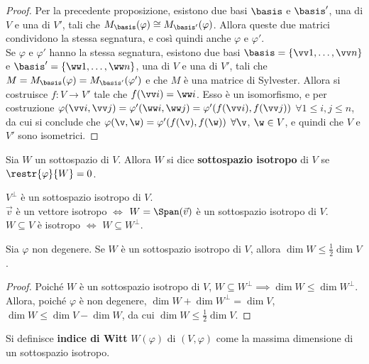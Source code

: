 \documentclass[11pt]{article}
\begin{document}
	\begin{proof}\nl\nl
		\rightproof Per la precedente proposizione, esistono due basi $\basis$ e $\basis'$, una di $V$ e una di $V'$,
		tali che $M_\basis(\varphi) \cong M_{\basis'}(\varphi)$. Allora queste due matrici condividono la stessa
		segnatura, e così quindi anche $\varphi$ e $\varphi'$. \\

		\leftproof Se $\varphi$ e $\varphi'$ hanno la stessa segnatura, esistono due basi $\basis = \{ \vv 1, \ldots, \vv n \}$ e $\basis' = \{ \ww 1, \ldots, \ww n \}$, una
		di $V$ e una di $V'$, tali che $M = M_\basis(\varphi) = M_{\basis'}(\varphi')$ e che $M$ è una matrice di
		Sylvester. Allora si costruisce $f : V \to V'$ tale che $f(\vv i) = \ww i$. Esso è un isomorfismo, e per
		costruzione $\varphi(\vv i, \vv j) = \varphi'(\ww i, \ww j) = \varphi'(f(\vv i), f(\vv j))$ $\forall 1 \leq i, j \leq n$, da cui
		si conclude che $\varphi(\v, \w) = \varphi'(f(\v), f(\w))$ $\forall \v$, $\w \in V$, e quindi che $V$ e
		$V'$ sono isometrici.
	\end{proof}

	\begin{definition}
		Sia $W$ un sottospazio di $V$. Allora $W$ si dice \textbf{sottospazio isotropo} di $V$
		se $\restr{\varphi}{W} = 0$.
	\end{definition}

	\begin{remark}\nl
		\li $V^\perp$ è un sottospazio isotropo di $V$. \\
		\li $\vec{v}$ è un vettore isotropo $\iff$ $W = \Span(\vec v)$ è un sottospazio isotropo di $V$. \\
		\li $W \subseteq V$ è isotropo $\iff$ $W \subseteq W^\perp$.
	\end{remark}

	\begin{proposition}
		Sia $\varphi$ non degenere. Se $W$ è un sottospazio isotropo di $V$, allora
		$\dim W \leq \frac{1}{2} \dim V$.
	\end{proposition}

	\begin{proof}
		Poiché $W$ è un sottospazio isotropo di $V$, $W \subseteq W^\perp \implies \dim W \leq \dim W^\perp$.
		Allora, poiché $\varphi$ è non degenere, $\dim W + \dim W^\perp = \dim V$, $\dim W \leq \dim V - \dim W$,
		da cui $\dim W \leq \frac{1}{2} \dim V$.
	\end{proof}

	\begin{definition}
		Si definisce \textbf{indice di Witt} $W(\varphi)$ di $(V, \varphi)$
		come la massima dimensione di un sottospazio isotropo. 
	\end{definition}
\end{document}
